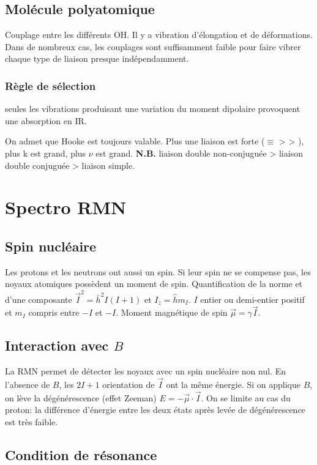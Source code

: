 \documentclass[11pt]{report}
\numberwithin{figure}{section}
\numberwithin{equation}{section}
\numberwithin{table}{section}
\newcommand{\1}{\boldsymbol{1}}
\begin{document}
\subsection{Molécule polyatomique}

Couplage entre les différents OH. Il y a vibration d'élongation et de déformations. Dans de nombreux cas, les couplages sont suffisamment faible pour faire vibrer chaque type de liaison presque indépendamment.

\subsubsection{Règle de sélection} seules les vibrations produisant une variation du moment dipolaire provoquent une absorption en IR.

On admet que Hooke est toujours valable. Plus une liaison est forte ($\equiv$ > \ce{=} > \ce{-}), plus k est grand, plus $\nu$ est grand. \textbf{N.B.} liaison double non-conjuguée > liaison double conjuguée > liaison simple.

\section{Spectro RMN}

\subsection{Spin nucléaire}

Les protons et les neutrons ont aussi un spin. Si leur spin ne se compense pas, les noyaux atomiques possèdent un moment de spin. Quantification de la norme et d'une composante $\vec{I}^2 = \bar{h}^2 I(I+1)$ et $I_z = \hat{h} m_I$. $I$ entier ou demi-entier positif et $m_I$ compris entre $-I$ et $-I$. Moment magnétique de spin $\vec{\mu} = \gamma \vec{I}$.

\subsection{Interaction avec $B$}

La RMN permet de détecter les noyaux avec un spin nucléaire non nul. En l'absence de $B$, les $2I+1$ orientation de $\vec{I}$ ont la même énergie. Si on applique $B$, on lève la dégénérescence (effet Zeeman) $E = -\vec{\mu} \cdot \vec{I}$. On se limite au cas du proton: la différence d'énergie entre les deux états après levée de dégénérescence est très faible.

\subsection{Condition de résonance}
\end{document}
